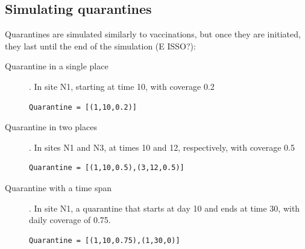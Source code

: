 \subsection{Simulating quarantines}
Quarantines are simulated similarly to vaccinations, but once they are initiated, they last until the end of the simulation (E ISSO?):
\begin{description}
\item[Quarantine in a single place].  In site N1, starting at time 10, with coverage 0.2
\begin{verbatim}
Quarantine = [(1,10,0.2)]
\end{verbatim}
\item[Quarantine in two places].  In sites N1 and N3, at times 10 and 12, respectively, with coverage 0.5
\begin{verbatim}
Quarantine = [(1,10,0.5),(3,12,0.5)]
\end{verbatim}
\item[Quarantine with a time span].  In site N1, a quarantine that starts at day 10 and ends at time 30, with daily coverage of 0.75.
\begin{verbatim}
Quarantine = [(1,10,0.75),(1,30,0)]
\end{verbatim}


\end{description}
